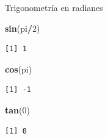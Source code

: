 \documentclass[
  ignorenonframetext,
  aspectratio=169]{beamer}
\newenvironment{Shaded}{\begin{snugshade}}{\end{snugshade}}
\newcommand{\DecValTok}[1]{\textcolor[rgb]{0.00,0.00,0.81}{#1}}
\newcommand{\FunctionTok}[1]{\textcolor[rgb]{0.13,0.29,0.53}{\textbf{#1}}}
\newcommand{\NormalTok}[1]{#1}
\newcommand{\SpecialCharTok}[1]{\textcolor[rgb]{0.81,0.36,0.00}{\textbf{#1}}}
\begin{document}
\begin{frame}[fragile]{Trigonometría en radianes}
\label{trigonometruxeda-en-radianes-1}
\begin{Shaded}
\begin{Highlighting}[]
\FunctionTok{sin}\NormalTok{(pi}\SpecialCharTok{/}\DecValTok{2}\NormalTok{)}
\end{Highlighting}
\end{Shaded}

\begin{verbatim}
[1] 1
\end{verbatim}

\begin{Shaded}
\begin{Highlighting}[]
\FunctionTok{cos}\NormalTok{(pi)}
\end{Highlighting}
\end{Shaded}

\begin{verbatim}
[1] -1
\end{verbatim}

\begin{Shaded}
\begin{Highlighting}[]
\FunctionTok{tan}\NormalTok{(}\DecValTok{0}\NormalTok{)}
\end{Highlighting}
\end{Shaded}

\begin{verbatim}
[1] 0
\end{verbatim}
\end{frame}
\end{document}
